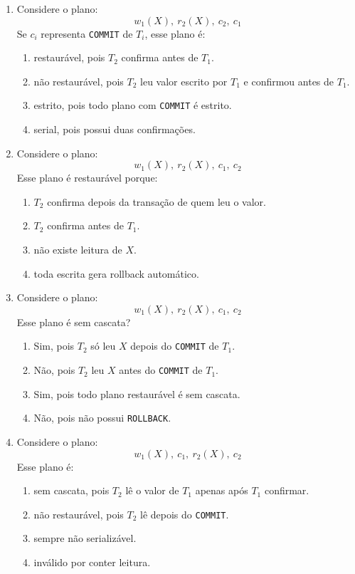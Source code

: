\documentclass[12pt,a4paper]{article}
\begin{document}
\begin{enumerate}[resume,label=\textbf{Q\arabic*.}]
\item Considere o plano:
\[
w_1(X),\ r_2(X),\ c_2,\ c_1
\]
Se $c_i$ representa \texttt{COMMIT} de $T_i$, esse plano é:

\begin{enumerate}[label=\alph*)]
    \item restaurável, pois $T_2$ confirma antes de $T_1$.
    \item não restaurável, pois $T_2$ leu valor escrito por $T_1$ e confirmou antes de $T_1$.
    \item estrito, pois todo plano com \texttt{COMMIT} é estrito.
    \item serial, pois possui duas confirmações.
\end{enumerate}

\item Considere o plano:
\[
w_1(X),\ r_2(X),\ c_1,\ c_2
\]
Esse plano é restaurável porque:

\begin{enumerate}[label=\alph*)]
    \item $T_2$ confirma depois da transação de quem leu o valor.
    \item $T_2$ confirma antes de $T_1$.
    \item não existe leitura de $X$.
    \item toda escrita gera rollback automático.
\end{enumerate}

\item Considere o plano:
\[
w_1(X),\ r_2(X),\ c_1,\ c_2
\]
Esse plano é sem cascata?

\begin{enumerate}[label=\alph*)]
    \item Sim, pois $T_2$ só leu $X$ depois do \texttt{COMMIT} de $T_1$.
    \item Não, pois $T_2$ leu $X$ antes do \texttt{COMMIT} de $T_1$.
    \item Sim, pois todo plano restaurável é sem cascata.
    \item Não, pois não possui \texttt{ROLLBACK}.
\end{enumerate}

\item Considere o plano:
\[
w_1(X),\ c_1,\ r_2(X),\ c_2
\]
Esse plano é:

\begin{enumerate}[label=\alph*)]
    \item sem cascata, pois $T_2$ lê o valor de $T_1$ apenas após $T_1$ confirmar.
    \item não restaurável, pois $T_2$ lê depois do \texttt{COMMIT}.
    \item sempre não serializável.
    \item inválido por conter leitura.
\end{enumerate}


\end{enumerate}
\end{document}
